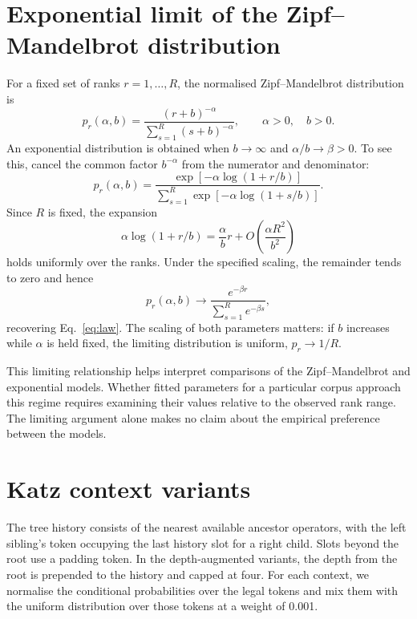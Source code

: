 \documentclass[10pt]{article}
\begin{document}
\section{Exponential limit of the Zipf--Mandelbrot distribution}\label{app:zipf-limit}
For a fixed set of ranks $r=1,\ldots,R$, the normalised Zipf--Mandelbrot distribution is
\begin{equation}
p_r(\alpha,b)=\frac{(r+b)^{-\alpha}}{\sum_{s=1}^{R}(s+b)^{-\alpha}},
\qquad \alpha>0,\quad b>0.
\end{equation}
An exponential distribution is obtained when $b\to\infty$ and $\alpha/b\to\beta>0$. To see this, cancel the common factor $b^{-\alpha}$ from the numerator and denominator:
\begin{equation}
p_r(\alpha,b)=\frac{\exp[-\alpha\log(1+r/b)]}{\sum_{s=1}^{R}\exp[-\alpha\log(1+s/b)]}.
\end{equation}
Since $R$ is fixed, the expansion
\begin{equation}
\alpha\log(1+r/b)=\frac{\alpha}{b}r+O\!\left(\frac{\alpha R^2}{b^2}\right)
\end{equation}
holds uniformly over the ranks. Under the specified scaling, the remainder tends to zero and hence
\begin{equation}
p_r(\alpha,b)\longrightarrow\frac{e^{-\beta r}}{\sum_{s=1}^{R}e^{-\beta s}},
\end{equation}
recovering Eq.~\eqref{eq:law}. The scaling of both parameters matters: if $b$ increases while $\alpha$ is held fixed, the limiting distribution is uniform, $p_r\to1/R$.

This limiting relationship helps interpret comparisons of the Zipf--Mandelbrot and exponential models. Whether fitted parameters for a particular corpus approach this regime requires examining their values relative to the observed rank range. The limiting argument alone makes no claim about the empirical preference between the models.

\clearpage
\section{Katz context variants}\label{app:prior-fitting}

The tree history consists of the nearest available ancestor operators, with the left sibling's token occupying the last history slot for a right child. Slots beyond the root use a padding token. In the depth-augmented variants, the depth from the root is prepended to the history and capped at four. For each context, we normalise the conditional probabilities over the legal tokens and mix them with the uniform distribution over those tokens at a weight of 0.001.
\end{document}
